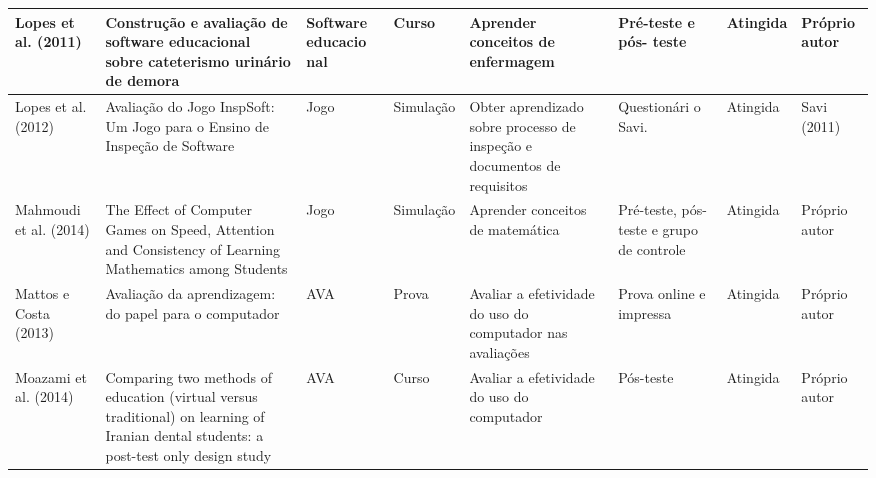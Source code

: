 \begin{table}
{\begin{tabular}{|L|m{5cm}|L|L|m{2.5cm}|m{2cm}|L|L|}
Lopes et al. (2011)            & Construção e avaliação de software educacional sobre cateterismo urinário de demora                                                                                                                    & Software educacio nal & Curso               & Aprender conceitos de enfermagem                                           & Pré-teste e pós- teste                                              & Atingida               & Próprio autor                                           \\ \hline
Lopes et al. (2012)            & Avaliação do Jogo InspSoft: Um Jogo para o Ensino de Inspeção de Software                                                                                                                              & Jogo                  & Simulação           & Obter aprendizado sobre processo de inspeção e documentos de requisitos    & Questionári o Savi.                                                 & Atingida               & Savi (2011)                                             \\ \hline
Mahmoudi et al. (2014)         & The Effect of Computer Games on Speed, Attention and Consistency of Learning Mathematics among Students                                                                                                & Jogo                  & Simulação           & Aprender conceitos de matemática                                           & Pré-teste, pós- teste e grupo de controle                           & Atingida               & Próprio autor                                           \\ \hline
Mattos e Costa (2013)          & Avaliação da aprendizagem: do papel para o computador                                                                                                                                                  & AVA                   & Prova               & Avaliar a efetividade do uso do computador nas avaliações                  & Prova online e impressa                                             & Atingida               & Próprio autor                                           \\ \hline
Moazami et al. (2014)          & Comparing two methods of education (virtual versus traditional) on learning of Iranian dental students: a post-test only design study                                                                  & AVA                   & Curso               & Avaliar a efetividade do uso do computador                                 & Pós-teste                                                           & Atingida               & Próprio autor                                           \\ \hline

\end{tabular}}
\end{table}
